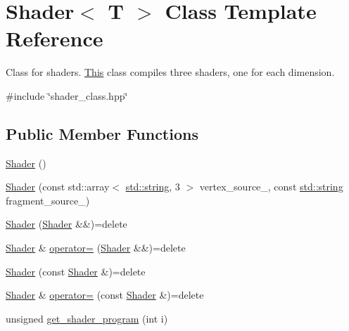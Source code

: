 \hypertarget{classShader}{}\section{Shader$<$ T $>$ Class Template Reference}
\label{classShader}


Class for shaders. \mbox{\hyperlink{classThis}{This}} class compiles three shaders, one for each dimension.  




{\ttfamily \#include \char`\"{}shader\+\_\+class.\+hpp\char`\"{}}

\subsection*{Public Member Functions}
\begin{DoxyCompactItemize}
\item 
\mbox{\hyperlink{classShader_a02faa1d7140779d7a24e06d1aff58d68}{Shader}} ()
\item 
\mbox{\hyperlink{classShader_ae93db4f8280ee456ca13eaa7b9c47ec5}{Shader}} (const std\+::array$<$ \mbox{\hyperlink{glad_8h_ac83513893df92266f79a515488701770}{std\+::string}}, 3 $>$ vertex\+\_\+source\+\_\+, const \mbox{\hyperlink{glad_8h_ac83513893df92266f79a515488701770}{std\+::string}} fragment\+\_\+source\+\_\+)
\item 
\mbox{\hyperlink{classShader_a7e30078f161d1c9f48a7b3921c01f816}{Shader}} (\mbox{\hyperlink{classShader}{Shader}} \&\&)=delete
\item 
\mbox{\hyperlink{classShader}{Shader}} \& \mbox{\hyperlink{classShader_a3b92fece66095389581a2bf6b3124657}{operator=}} (\mbox{\hyperlink{classShader}{Shader}} \&\&)=delete
\item 
\mbox{\hyperlink{classShader_a49b2a448a00b5e1413c17501f8873cca}{Shader}} (const \mbox{\hyperlink{classShader}{Shader}} \&)=delete
\item 
\mbox{\hyperlink{classShader}{Shader}} \& \mbox{\hyperlink{classShader_a58f724fecccecdb1633e08ce0258da37}{operator=}} (const \mbox{\hyperlink{classShader}{Shader}} \&)=delete
\item 
unsigned \mbox{\hyperlink{classShader_a2c19b216850480109f9d5f7ed6ab6aa6}{get\+\_\+shader\+\_\+program}} (int i)
\end{DoxyCompactItemize}

